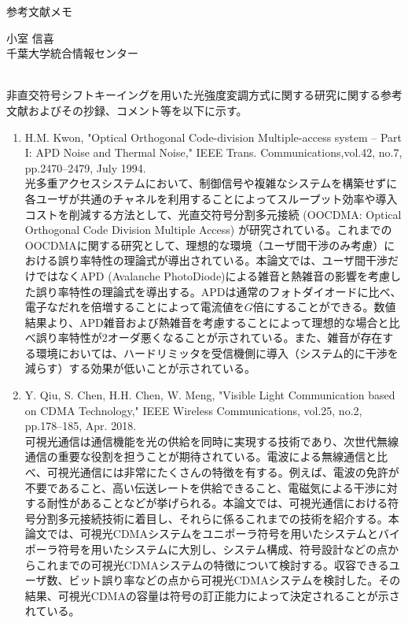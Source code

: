 ﻿\documentclass[a4j,10pt]{jarticle}
\begin{document}
\begin{center}
\large
参考文献メモ 
\end{center}
\begin{flushright}
小室 信喜 \\
千葉大学統合情報センター
\end{flushright}
\hrulefill \\
非直交符号シフトキーイングを用いた光強度変調方式に関する研究に関する参考文献およびその抄録、コメント等を以下に示す。
\begin{enumerate}
\item H.M. Kwon, 
"Optical Orthogonal Code-division Multiple-access system -- Part I: APD Noise and Thermal Noise," 
IEEE Trans. Communications,vol.42, no.7, pp.2470--2479, July 1994. \\
光多重アクセスシステムにおいて、制御信号や複雑なシステムを構築せずに各ユーザが共通のチャネルを利用することによってスループット効率や導入コストを削減する方法として、光直交符号分割多元接続 (OOCDMA: Optical Orthogonal Code Division Multiple Access) が研究されている。これまでのOOCDMAに関する研究として、理想的な環境（ユーザ間干渉のみ考慮）における誤り率特性の理論式が導出されている。本論文では、ユーザ間干渉だけではなくAPD (Avalanche PhotoDiode)による雑音と熱雑音の影響を考慮した誤り率特性の理論式を導出する。APDは通常のフォトダイオードに比べ、電子なだれを倍増することによって電流値を$G$倍にすることができる。数値結果より、APD雑音および熱雑音を考慮することによって理想的な場合と比べ誤り率特性が2オーダ悪くなることが示されている。また、雑音が存在する環境においては、ハードリミッタを受信機側に導入（システム的に干渉を減らす）する効果が低いことが示されている。
%
\item Y. Qiu, S. Chen, H.H. Chen, W. Meng, 
"Visible Light Communication based on CDMA Technology," 
IEEE Wireless Communications, vol.25, no.2, pp.178--185, Apr. 2018.\\
可視光通信は通信機能を光の供給を同時に実現する技術であり、次世代無線通信の重要な役割を担うことが期待されている。電波による無線通信と比べ、可視光通信には非常にたくさんの特徴を有する。例えば、電波の免許が不要であること、高い伝送レートを供給できること、電磁気による干渉に対する耐性があることなどが挙げられる。本論文では、可視光通信における符号分割多元接続技術に着目し、それらに係るこれまでの技術を紹介する。本論文では、可視光CDMAシステムをユニポーラ符号を用いたシステムとバイポーラ符号を用いたシステムに大別し、システム構成、符号設計などの点からこれまでの可視光CDMAシステムの特徴について検討する。収容できるユーザ数、ビット誤り率などの点から可視光CDMAシステムを検討した。その結果、可視光CDMAの容量は符号の訂正能力によって決定されることが示されている。

\end{enumerate}
\end{document}
